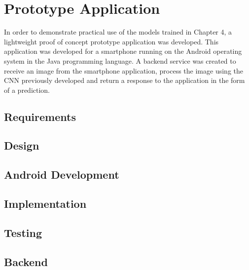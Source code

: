 \chapter{Prototype Application}
\label{prototype}
In order to demonstrate practical use of the models trained in Chapter 4, a lightweight proof of concept prototype application was developed.
This application was developed for a smartphone running on the Android operating system in the Java programming language.
A backend service was created to receive an image from the smartphone
application, process the image using the CNN previously developed and return a
response to the application in the form of a prediction.

\section{Requirements}


\section{Design}


\section{Android Development}


\section{Implementation}


\section{Testing}


\section{Backend}


